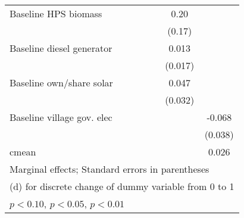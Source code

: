 \begin{table}[htbp]
\begin{tabular*}{1\hsize}{@{\hskip\tabcolsep\extracolsep\fill}l*{6}{c}}
Baseline HPS biomass&                  &                  &                  &                  &     0.20         &                  \\
                &                  &                  &                  &                  &   (0.17)         &                  \\
Baseline diesel generator&                  &                  &                  &                  &    0.013         &                  \\
                &                  &                  &                  &                  &  (0.017)         &                  \\
Baseline own/share solar&                  &                  &                  &                  &    0.047         &                  \\
                &                  &                  &                  &                  &  (0.032)         &                  \\
Baseline village gov. elec&                  &                  &                  &                  &                  &   -0.068\sym{*}  \\
                &                  &                  &                  &                  &                  &  (0.038)         \\
\midrule
cmean           &                  &                  &                  &                  &                  &    0.026         \\
\bottomrule
\multicolumn{7}{l}{\footnotesize Marginal effects; Standard errors in parentheses}\\
\multicolumn{7}{l}{\footnotesize  (d) for discrete change of dummy variable from 0 to 1}\\
\multicolumn{7}{l}{\footnotesize \sym{*} \(p<0.10\), \sym{**} \(p<0.05\), \sym{***} \(p<0.01\)}\\
\end{tabular*}
\end{table}
